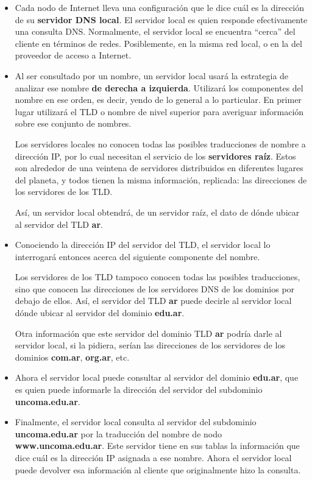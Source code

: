 \documentclass[spanish,A4,]{article}
\begin{document}
\begin{itemize}
\item
  Cada nodo de Internet lleva una configuración que le dice cuál es la
  dirección de su \textbf{servidor DNS local}. El servidor local es
  quien responde efectivamente una consulta DNS. Normalmente, el
  servidor local se encuentra ``cerca'' del cliente en términos de
  redes. Posiblemente, en la misma red local, o en la del proveedor de
  acceso a Internet.
\item
  Al ser consultado por un nombre, un servidor local usará la estrategia
  de analizar ese nombre \textbf{de derecha a izquierda}. Utilizará los
  componentes del nombre en ese orden, es decir, yendo de lo general a
  lo particular. En primer lugar utilizará el TLD o nombre de nivel
  superior para averiguar información sobre ese conjunto de nombres.

  Los servidores locales no conocen todas las posibles traducciones de
  nombre a dirección IP, por lo cual necesitan el servicio de los
  \textbf{servidores raíz}. Estos son alrededor de una veintena de
  servidores distribuidos en diferentes lugares del planeta, y todos
  tienen la misma información, replicada: las direcciones de los
  servidores de los TLD.

  Así, un servidor local obtendrá, de un servidor raíz, el dato de dónde
  ubicar al servidor del TLD \textbf{ar}.
\item
  Conociendo la dirección IP del servidor del TLD, el servidor local lo
  interrogará entonces acerca del siguiente componente del nombre.

  Los servidores de los TLD tampoco conocen todas las posibles
  traducciones, sino que conocen las direcciones de los servidores DNS
  de los dominios por debajo de ellos. Así, el servidor del TLD
  \textbf{ar} puede decirle al servidor local dónde ubicar al servidor
  del dominio \textbf{edu.ar}.

  Otra información que este servidor del dominio TLD \textbf{ar} podría
  darle al servidor local, si la pidiera, serían las direcciones de los
  servidores de los dominios \textbf{com.ar}, \textbf{org.ar}, etc.
\item
  Ahora el servidor local puede consultar al servidor del dominio
  \textbf{edu.ar}, que es quien puede informarle la dirección del
  servidor del subdominio \textbf{uncoma.edu.ar}.
\item
  Finalmente, el servidor local consulta al servidor del subdominio
  \textbf{uncoma.edu.ar} por la traducción del nombre de nodo
  \textbf{www.uncoma.edu.ar}. Este servidor tiene en sus tablas la
  información que dice cuál es la dirección IP asignada a ese nombre.
  Ahora el servidor local puede devolver esa información al cliente que
  originalmente hizo la consulta.
\end{itemize}
\end{document}
